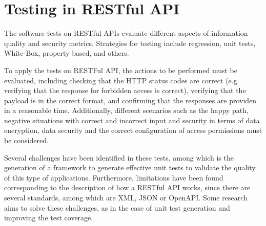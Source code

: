 \section{Testing in RESTful API}\label{sec:API-testing}

The software tests on RESTful APIs\cite{Golmohammadi2023} evaluate different aspects of information quality and security metrics. Strategies for testing include regression\cite{Godefroid2020}, unit tests\cite{Golmohammadi2023}, White-Box\cite{Arcuri2021}, property based\cite{Karlsson2020}, and others.

To apply the tests on RESTFul API\cite{De2017}, the actions to be performed must be evaluated, including checking that the HTTP status codes are correct (e.g verifying that the response for forbidden access is correct), verifying that the payload is in the correct format, and confirming that the responses are providen in a reasonable time. Additionally, different scenarios such as the happy path, negative situations with correct and incorrect input and security in terms of data encryption, data security and the correct configuration of access permissions must be considered.

Several challenges have been identified in these tests\cite{Ehsan2022}, among which is the generation of a framework to generate effective unit tests to validate the quality of this type of applications. Furthermore, limitations have been found corresponding to the description of how a RESTful API works, since there are several standards, among which are XML, JSON or OpenAPI.  Some research aims to solve these challenges, as in the case of unit test generation\cite{Arcuri2019,segura2018,Arcuri2017,Viglianisi2020} and improving the test coverage\cite{Wu2022}.
